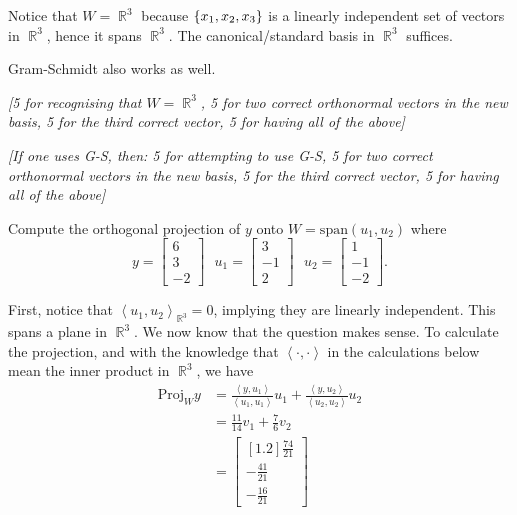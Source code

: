 \documentclass[answers,11pt]{exam}
\theoremstyle{definition}
\DeclareMathOperator{\R}{\mathbb{R}}
\DeclareMathOperator{\1}{\mathbbm{1}}
\newcommand{\innerproduct}[2]{\left\langle #1,#2 \right\rangle}
\newcommand{\proj}[2]{\mathrm{Proj}_{#1} {#2} }
\begin{document}
\begin{questions}
\begin{solution}
	Notice that $W = \R^3$ because $\set{x_1,x_2,x_3}$ is a linearly independent set of vectors in $\R^3$, hence it spans $\R^3$. The canonical/standard basis in $\R^3$ suffices.
	
	Gram-Schmidt also works as well.
	
	\textit{[5 for recognising that $W = \R^3$, 5 for two correct orthonormal vectors in the new basis, 5 for the third correct vector, 5 for having all of the above]}
	
	\textit{[If one uses G-S, then: 5 for attempting to use G-S, 5 for two correct orthonormal vectors in the new basis, 5 for the third correct vector, 5 for having all of the above]}
\end{solution}

\question[25] Compute the orthogonal projection of $y$ onto $W = \text{span}(u_1,u_2)$ where 
\begin{equation*}
y=
\begin{bmatrix}
6\\
3\\
-2
\end{bmatrix}\:\:\:
u_1=
\begin{bmatrix}
3\\
-1\\
2
\end{bmatrix}\:\:\:
u_2=
\begin{bmatrix}
1\\
-1\\
-2
\end{bmatrix}.
\end{equation*}
\addpoints

\begin{solution}
	First, notice that $\innerproduct{u_1}{u_2}_{\R^3} = 0$, implying they are linearly independent. This spans a plane in $\R^3$. We now know that the question makes sense. To calculate the projection, and with the knowledge that $\innerproduct{\cdot}{\cdot}$ in the calculations below mean the inner product in $\R^3$, we have
	\begin{align}
	\nonumber	\proj{W}{y} &= \frac{\innerproduct{y}{u_1}}{\innerproduct{u_1}{u_1}} u_1 + \frac{\innerproduct{y}{u_2}}{\innerproduct{u_2}{u_2}} u_2 \\
	\label{eq1}	&= \frac{11}{14} v_1 + \frac{7}{6} v_2\\
	\label{eq2}	&= \begin{bmatrix}[1.2]
		\frac{74}{21} \\ -\frac{41}{21} \\ -\frac{16}{21}
		\end{bmatrix}
	\end{align} 
	

\end{solution}
\end{questions}
\end{document}
